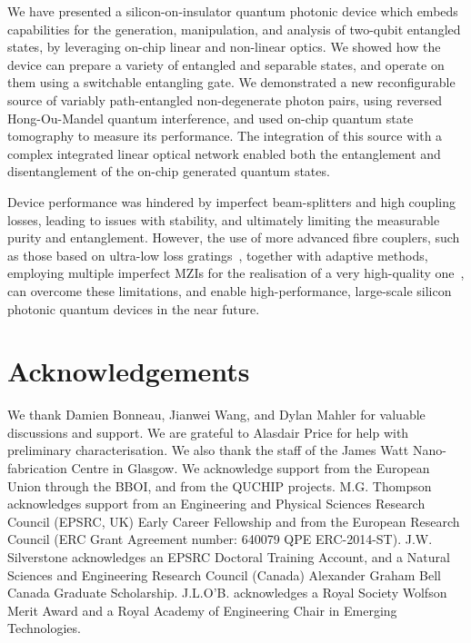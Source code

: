 \documentclass[
twocolumn,
 amsmath,amssymb,
 aps,
  twoside,
 superscriptaddress,
pra,
longbibliography
]{revtex4-1}
\begin{document}
We have presented a silicon-on-insulator quantum photonic device which embeds capabilities for the generation, manipulation, and analysis of two-qubit entangled states, by leveraging on-chip linear and non-linear optics. We showed how the device can prepare a variety of entangled and separable states, and operate on them using a switchable entangling gate. We demonstrated a new reconfigurable source of variably path-entangled non-degenerate photon pairs, using reversed Hong-Ou-Mandel quantum interference, and used on-chip quantum state tomography to measure its performance. 
The integration of this source with a complex integrated linear optical network enabled both the entanglement and disentanglement of the on-chip generated quantum states.

Device performance was hindered by imperfect beam-splitters and high coupling losses, leading to issues with stability, and ultimately limiting the measurable purity and entanglement. However, the use of more advanced fibre couplers, such as those based on ultra-low loss gratings~\cite{Ding:2013hl}, together with adaptive methods, employing multiple imperfect MZIs for the realisation of a very high-quality one~\cite{Wilkes:2016ba}, can overcome these limitations, and enable high-performance, large-scale silicon photonic quantum devices in the near future.








\section*{Acknowledgements}


We thank Damien Bonneau, Jianwei Wang, and Dylan Mahler for valuable discussions and support. We are grateful to Alasdair Price for help with preliminary characterisation. We also thank the staff of the James Watt Nano-fabrication Centre in Glasgow. We acknowledge support from the European Union through the BBOI, and from the QUCHIP projects. M.G. Thompson acknowledges support from an Engineering and Physical Sciences Research Council (EPSRC, UK) Early Career Fellowship and from the European Research Council (ERC Grant Agreement number: 640079 QPE ERC-2014-ST). J.W. Silverstone acknowledges an EPSRC Doctoral Training Account, and a Natural Sciences and Engineering Research Council (Canada) Alexander Graham Bell Canada Graduate Scholarship. J.L.O'B. acknowledges a Royal Society Wolfson Merit Award and a Royal Academy of Engineering Chair in Emerging Technologies.
\end{document}
